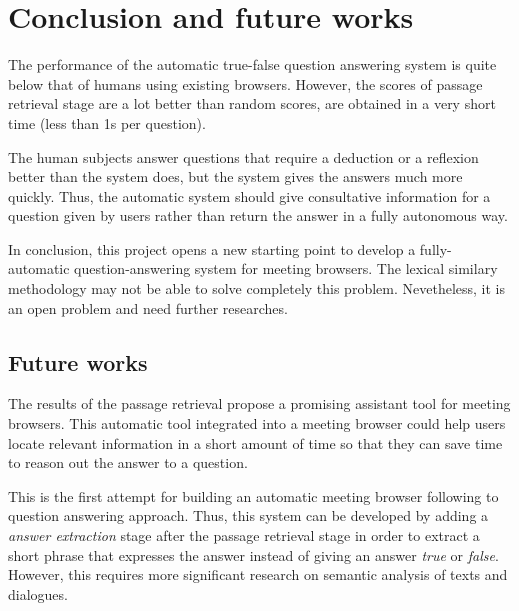 



\chapter{Conclusion and future works}

The performance of the automatic true-false question answering system is quite below that of humans using existing browsers. However, the scores of passage retrieval stage are a lot better  than random scores, are obtained in a very short time (less than 1s per question).

The human subjects answer questions that require a deduction or a reflexion better than the system does, but the system gives the answers much more quickly. Thus, the automatic system should give consultative information for a question given by users rather than return the answer in a fully autonomous way.

In conclusion, this project opens a new starting point to develop a fully-automatic question-answering system for meeting browsers. The lexical similary methodology may not be able to solve completely this problem. Nevetheless, it is an open problem and need further researches. 

\section*{Future works}
The results of the passage retrieval propose a promising assistant tool for meeting browsers. This automatic tool integrated into a meeting browser could help users locate relevant information in a short amount of time so that they can save time to reason out the answer to a question.

This is the first attempt for building an automatic meeting browser following to question answering approach. Thus, this system can be developed by adding a \textit{answer extraction} stage after the passage retrieval stage in order to extract a short phrase that expresses the answer instead of giving an answer \textit{true} or \textit{false}. However, this requires more significant research on semantic analysis of texts and dialogues.